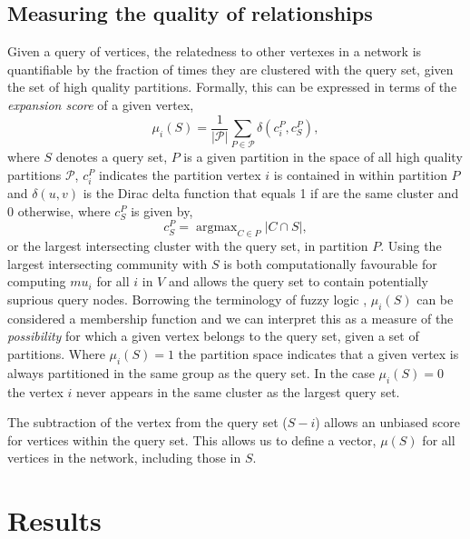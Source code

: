\documentclass[a4paper,10pt]{article}
\DeclareMathOperator*{\argmax}{argmax}
\begin{document}
\subsection{Measuring the quality of relationships} \label{sec:expansion}
Given a query of vertices, the relatedness to other vertexes in a network is quantifiable by the fraction of times they are clustered with the query set, given the set of high quality partitions.
Formally, this can be expressed in terms of the \textit{expansion score} of a given vertex,
\begin{equation} \label{eq:mu_score}
\mu_i(S) = \frac{1}{|\mathcal{P}|} \sum_{P \in \mathcal{P}} \delta(c^{P}_i, c^{P}_S),
\end{equation}
where $S$ denotes a query set, $P$ is a given partition in the space of all high quality partitions $\mathcal{P}$, $c^{P}_{i}$ indicates the partition vertex $i$ is contained in within partition $P$ and
$\delta(u, v)$ is the Dirac delta function that equals 1 if are the same cluster and $0$ otherwise, where $c^{P}_S$ is given by,
\begin{equation}
 c^{P}_S = \argmax_{C \in P} |C \cap S|,
\end{equation}
or the largest intersecting cluster with the query set, in partition $P$.
Using the largest intersecting community with $S$ is both computationally favourable for computing $mu_i$ for all $i$ in $V$ and allows the query set to contain potentially suprious query nodes.
Borrowing the terminology of fuzzy logic \cite{zimmermann2001fuzzy}, \textit{$\mu_i(S)$} can be considered a membership function and we can interpret this as a measure of the \textit{possibility} for which a given vertex belongs to the query set, given a set of partitions.
Where $\mu_i(S) = 1$ the partition space indicates that a given vertex is always partitioned in the same group as the query set.
In the case $\mu_i(S) = 0$ the vertex $i$ never appears in the same cluster as the largest query set.

The subtraction of the vertex from the query set ($S - i$) allows an unbiased score for vertices within the query set.
This allows us to define a vector, $\mu(S)$ for all vertices in the network, including those in $S$.

\section{Results}
\end{document}
